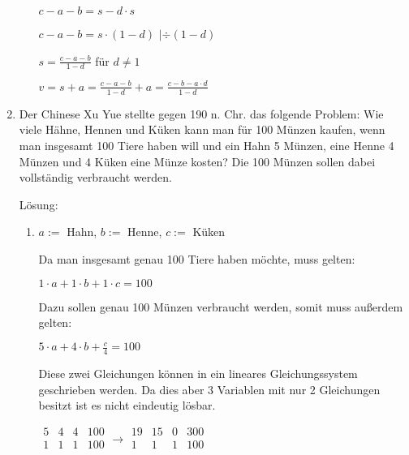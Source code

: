 \documentclass[../main.tex]{subfiles}
\begin{document}
\begin{enumerate}
\begin{enumerate}
		            \(
		            c - a - b = s - d \cdot s
		            \)

		            \(
		            c - a - b = s \cdot (1 - d)
		            \)
		            \(|\)\(
		            \div (1-d)
		            \)

		            \(
		            s = \frac{c - a - b}{1-d}
		            \) für \(
		            d \neq 1
		            \)

		            \(
		            v = s + a = \frac{c - a - b}{1-d} + a = \frac{c - b - a \cdot d}{1 - d}
		            \)
	      \end{enumerate}
	\item Der Chinese Xu Yue stellte gegen 190 n. Chr. das folgende Problem:
	      Wie viele Hähne, Hennen und Küken kann man für 100 Münzen kaufen,
	      wenn man insgesamt 100 Tiere haben will und ein Hahn 5 Münzen,
	      eine Henne 4 Münzen und 4 Küken eine Münze kosten?
	      Die 100 Münzen sollen dabei vollständig verbraucht werden.

	      Lösung:
	      \begin{enumerate}
		      \item
		            \(
		            a :=
		            \) Hahn,
		            \(
		            b :=
		            \) Henne,
		            \(
		            c :=
		            \) Küken

		            Da man insgesamt genau 100 Tiere haben möchte, muss gelten:

		            \(
		            1 \cdot a + 1 \cdot b + 1 \cdot c = 100
		            \)

		            Dazu sollen genau 100 Münzen verbraucht werden, somit muss außerdem gelten:

		            \(
		            5 \cdot a + 4 \cdot b + \frac{c}{4} = 100
		            \)

		            Diese zwei Gleichungen können in ein lineares Gleichungssystem geschrieben werden.
		            Da dies aber 3 Variablen mit nur 2 Gleichungen besitzt ist es nicht eindeutig lösbar.

		            \(
		            \begin{array}{ccc|c}
			            5 & 4 & 4 & 100 \\
			            1 & 1 & 1 & 100 \\
		            \end{array}
		            \rightarrow
		            \begin{array}{ccc|c}
			            19 & 15 & 0 & 300 \\
			            1  & 1  & 1 & 100 \\
		            \end{array}
		            \)


\end{enumerate}
\end{enumerate}
\end{document}
